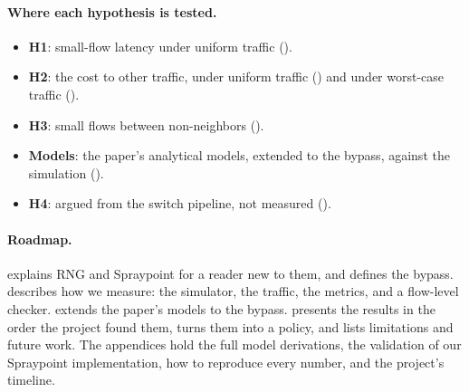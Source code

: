 \paragraph{Where each hypothesis is tested.}
\begin{itemize}
  \item \textbf{H1}: small-flow latency under uniform traffic ().
  \item \textbf{H2}: the cost to other traffic, under uniform traffic () and under worst-case traffic ().
  \item \textbf{H3}: small flows between non-neighbors ().
  \item \textbf{Models}: the paper's analytical models, extended to the bypass, against the simulation ().
  \item \textbf{H4}: argued from the switch pipeline, not measured ().
\end{itemize}

\paragraph{Roadmap.}
 explains RNG and Spraypoint for a reader new to them, and  defines the bypass.  describes how we measure: the simulator, the traffic, the metrics, and a flow-level checker.  extends the paper's models to the bypass.  presents the results in the order the project found them,  turns them into a policy, and  lists limitations and future work. The appendices hold the full model derivations, the validation of our Spraypoint implementation, how to reproduce every number, and the project's timeline.
